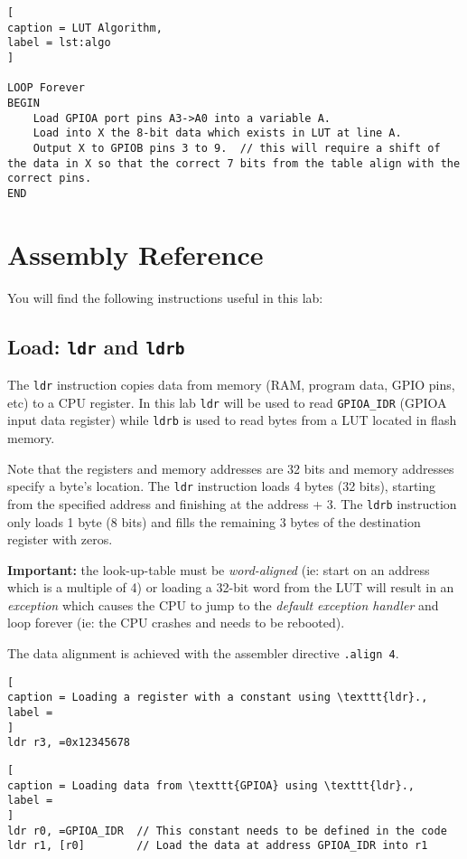 \documentclass{UoNMCHA}
\numberwithin{equation}{section}
\begin{document}
\begin{lstlisting}[
caption = LUT Algorithm,
label = lst:algo
]

LOOP Forever
BEGIN
    Load GPIOA port pins A3->A0 into a variable A.
    Load into X the 8-bit data which exists in LUT at line A.
    Output X to GPIOB pins 3 to 9.  // this will require a shift of the data in X so that the correct 7 bits from the table align with the correct pins.
END
\end{lstlisting}

\section{Assembly Reference}\label{sec:asm}

You will find the following instructions useful in this lab:

\subsection{Load: \texttt{ldr} and \texttt{ldrb}}

The \texttt{ldr} instruction copies data from memory (RAM, program data, GPIO pins, etc) to a CPU register. In this lab \texttt{ldr} will be used to read \texttt{GPIOA\_IDR} (GPIOA input data register) while \texttt{ldrb} is used to read bytes from a LUT located in flash memory.

Note that the registers and memory addresses are 32 bits and memory addresses specify a byte's location. The \texttt{ldr} instruction loads 4 bytes (32 bits), starting from the specified address and finishing at the address + 3. The \texttt{ldrb} instruction only loads 1 byte (8 bits) and fills the remaining 3 bytes of the destination register with zeros.

\textbf{Important:} the look-up-table must be \textit{word-aligned} (ie: start on an address which is a multiple of 4) or loading a 32-bit word from the LUT will result in an \textit{exception} which causes the CPU to jump to the \textit{default exception handler} and loop forever (ie: the CPU crashes and needs to be rebooted).

The data alignment is achieved with the assembler directive \texttt{.align 4}.

\begin{lstlisting}[
caption = Loading a register with a constant using \texttt{ldr}.,
label = 
]
ldr r3, =0x12345678
\end{lstlisting}

\begin{lstlisting}[
caption = Loading data from \texttt{GPIOA} using \texttt{ldr}.,
label = 
]
ldr r0, =GPIOA_IDR  // This constant needs to be defined in the code
ldr r1, [r0]        // Load the data at address GPIOA_IDR into r1
\end{lstlisting}
\end{document}
